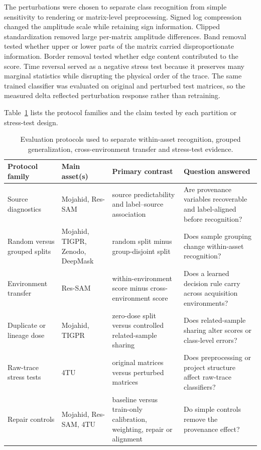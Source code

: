 \documentclass[]{interact}
\begin{document}
The perturbations were chosen to separate class recognition from simple sensitivity to rendering or matrix-level preprocessing. Signed log compression changed the amplitude scale while retaining sign information. Clipped standardization removed large per-matrix amplitude differences. Band removal tested whether upper or lower parts of the matrix carried disproportionate information. Border removal tested whether edge content contributed to the score. Time reversal served as a negative stress test because it preserves many marginal statistics while disrupting the physical order of the trace. The same trained classifier was evaluated on original and perturbed test matrices, so the measured delta reflected perturbation response rather than retraining.

Table~\ref{tab:evaluation_protocols} lists the protocol families and the claim tested by each partition or stress-test design.

\begin{table}[H]
\caption{Evaluation protocols used to separate within-asset recognition, grouped generalization, cross-environment transfer and stress-test evidence.}
\label{tab:evaluation_protocols}
\centering
\footnotesize
\begin{tabular}{p{}p{}p{}p{}}
\toprule
Protocol family & Main asset(s) & Primary contrast & Question answered \\
\midrule
Source diagnostics & Mojahid, Res-SAM & source predictability and label--source association & Are provenance variables recoverable and label-aligned before recognition? \\
Random versus grouped splits & Mojahid, TIGPR, Zenodo, DeepMask & random split minus group-disjoint split & Does sample grouping change within-asset recognition? \\
Environment transfer & Res-SAM & within-environment score minus cross-environment score & Does a learned decision rule carry across acquisition environments? \\
Duplicate or lineage dose & Mojahid, TIGPR & zero-dose split versus controlled related-sample sharing & Does related-sample sharing alter scores or class-level errors? \\
Raw-trace stress tests & 4TU & original matrices versus perturbed matrices & Does preprocessing or project structure affect raw-trace classifiers? \\
Repair controls & Mojahid, Res-SAM, 4TU & baseline versus train-only calibration, weighting, repair or alignment & Do simple controls remove the provenance effect? \\
\bottomrule
\end{tabular}
\end{table}
\end{document}
